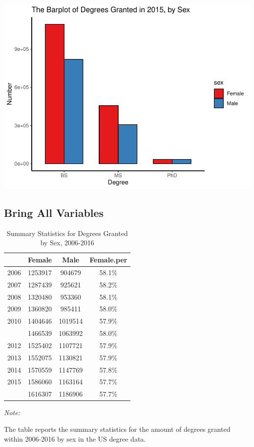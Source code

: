 \documentclass[
  12pt,
]{article}
\begin{document}
\includegraphics{hw1_sol_files/figure-latex/unnamed-chunk-10-1.pdf}

\hypertarget{bring-all-variables}{%
\subsection{Bring All Variables}\label{bring-all-variables}}

\begin{table}[H]

\caption{\label{tab:unnamed-chunk-11}Summary Statistics for Degrees Granted by Sex, 2006-2016}
\centering
\begin{threeparttable}
\begin{tabular}[t]{llcc}
\toprule
  & Female & Male & Female.per\\
\midrule
2006 & 1253917 & 904679 & 58.1\%\\
2007 & 1287439 & 925621 & 58.2\%\\
2008 & 1320480 & 953360 & 58.1\%\\
2009 & 1360820 & 985411 & 58.0\%\\
2010 & 1404646 & 1019514 & 57.9\%\\
\addlinespace
2011 & 1466539 & 1063992 & 58.0\%\\
2012 & 1525402 & 1107721 & 57.9\%\\
2013 & 1552075 & 1130821 & 57.9\%\\
2014 & 1570559 & 1147769 & 57.8\%\\
2015 & 1586060 & 1163164 & 57.7\%\\
\addlinespace
2016 & 1616307 & 1186906 & 57.7\%\\
\bottomrule
\end{tabular}
\begin{tablenotes}
\item \textit{Note: } 
\item The table reports the summary statistics for the amount of degrees granted within 2006-2016 by sex in the US degree data.
\end{tablenotes}
\end{threeparttable}
\end{table}
\end{document}
